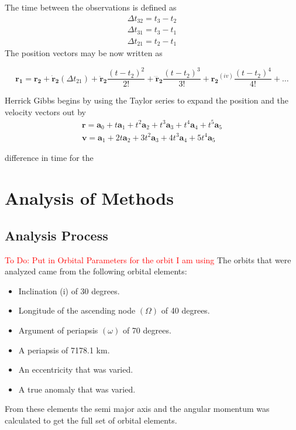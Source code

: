 \documentclass[12pt]{article}
\begin{document}
		The time between the observations is defined as 
		\begin{equation}
		\begin{array} { l } { \Delta t _ { 32 } = t _ { 3 } - t _ { 2 } } \\ { \Delta t _ { 31 } = t _ { 3 } - t _ { 1 } } \\ { \Delta t _ { 21 } = t _ { 2 } - t _ { 1 } } \end{array}
		\end{equation}
		The position vectors may be now written as 
		
		\begin{equation}
		\mathbf{r_1}=\mathbf{r_2}+\mathbf{\dot{r}_2} (\Delta t _ { 21 } ) + \mathbf{\ddot{r}_2} \frac{(t-t_2)^2}{2!}+ \mathbf{\dddot{r}_2} \frac{(t-t_2)^3}{3!}+ \mathbf{{r_2}}^{(iv)} \frac{(t-t_2)^4}{4!}+\dots
		\end{equation}

	
	
	Herrick Gibbs begins by using the Taylor series to expand the position and the velocity vectors out by 
	\begin{equation}
	\begin{array} { l } { \mathbf { r } = \mathbf { a } _ { 0 } + t \mathbf { a } _ { 1 } + t ^ { 2 } \mathbf { a } _ { 2 } + t ^ { 3 } \mathbf { a } _ { 3 } + t ^ { 4 } \mathbf { a } _ { 4 } + t ^ { 5 } \mathbf { a } _ { 5 } } \\ { \mathbf { v } = \mathbf { a } _ { 1 } + 2 t \mathbf { a } _ { 2 } + 3 t ^ { 2 } \mathbf { a } _ { 3 } + 4 t ^ { 3 } \mathbf { a } _ { 4 } + 5 t ^ { 4 } \mathbf { a } _ { 5 } } \end{array}
	\end{equation}
	
	
	

	
	difference in time for the 
	\fi
	\section{Analysis of Methods}
	\subsection{Analysis Process}
	\textcolor{red}{To Do: Put in Orbital Parameters for the orbit I am using}
	The orbits that were analyzed came from the following orbital elements:
	\begin{itemize}
		\item Inclination (i) of 30 degrees.
		\item Longitude of the ascending node $(\Omega)$ of 40 degrees.
		\item Argument of periapsis $(\omega)$ of 70 degrees.
		\item A periapsis of 7178.1 km. 
		\item An eccentricity that was varied.
		\item A true anomaly that was varied.
	\end{itemize}
	From these elements the semi major axis and the angular momentum was calculated to get the full set of orbital elements. 
	
\end{document}
